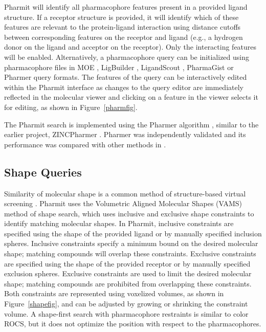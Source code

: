 Pharmit will identify all pharmacophore features present in a provided ligand structure. If a receptor structure is provided, it will identify which of these features are relevant to the protein-ligand interaction using distance cutoffs between corresponding features on the receptor and ligand (e.g., a hydrogen donor on the ligand and acceptor on the receptor). Only the interacting features will be enabled. Alternatively, a pharmacophore query can be initialized using pharmacophore files in MOE \cite{moe}, LigBuilder \cite{Wang_2000}, LigandScout \cite{Wolber_2005}, PharmaGist \cite{Schneidman_Duhovny_2008} or Pharmer \cite{Koes_2011} query formats.  The features of the query can be interactively edited within the Pharmit interface as changes to the query editor are immediately reflected in the molecular viewer and clicking on a feature in the viewer selects it for editing, as shown in Figure~\ref{pharmfig}.

The Pharmit search is implemented using the Pharmer algorithm \cite{Koes 2011}, similar to the earlier project, ZINCPharmer \cite{Koes 2012}.  Pharmer was independently validated and its performance was compared with other methods in \cite{Sanders 2012}.


\subsection{Shape Queries}

Similarity of molecular shape is a common method of structure-based virtual screening \cite{Nicholls_2010}.  Pharmit uses the Volumetric Aligned Molecular Shapes (VAMS) \cite{vams} method of shape search, which uses inclusive and exclusive shape constraints to identify matching molecular shapes.  In Pharmit, inclusive constraints are specified using the shape of the provided ligand or by manually specified inclusion spheres. Inclusive constraints specify a minimum bound on the desired molecular shape; matching compounds will overlap these constraints. Exclusive constraints are specified using the shape of the provided receptor or by manually specified exclusion spheres.  Exclusive constraints are used to limit the desired molecular shape; matching compounds are prohibited from overlapping these constraints.  Both constraints are represented using voxelized volumes, as shown in Figure~\ref{shapefig}, and can be adjusted by growing or shrinking the constraint volume. A shape-first search with pharmacophore restraints is similar to color ROCS, but it does not optimize the position with respect to the pharmacophores.

